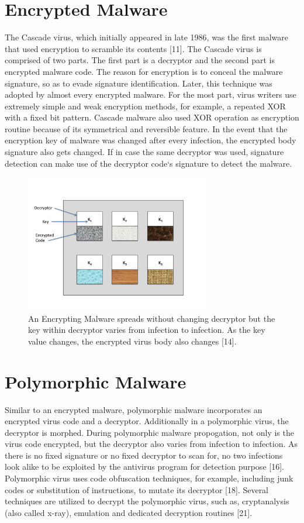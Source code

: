 \section{Encrypted Malware} 

The Cascade virus, which initially appeared in late 1986, was the first malware that used encryption to scramble its contents [11]. The Cascade virus is comprised of two parts. The first part is a decryptor and the second part is encrypted malware code. The reason for encryption is to conceal the malware signature, so as to evade signature identification. Later, this technique was adopted by almost every encrypted malware.  For the most part, virus writers use extremely simple and weak encryption methods, for example, a repeated XOR with a fixed bit pattern. Cascade malware also used XOR operation as encryption routine because of its symmetrical and reversible feature. In the event that the encryption key of malware was changed after every infection, the encrypted body signature also gets changed. If in case the same decryptor was used, signature detection can make use of the decryptor code`s signature to detect the malware.
\begin{figure}
    \centering    
    \includegraphics[width=8cm, height=6cm]{encryptedvirus.jpg}
    \caption[Encrypted Malware Replication]{An Encrypting Malware spreads without changing decryptor but the key within decryptor varies from infection to infection. As the key value changes, the encrypted virus body also changes [14].}
\end{figure}
\section{Polymorphic Malware} 

Similar to an encrypted malware, polymorphic malware incorporates an encrypted virus code and a decryptor. Additionally in a polymorphic virus, the decryptor is morphed. During polymorphic malware propogation, not only is the virus code encrypted, but the decryptor also varies from infection to infection. As there is no fixed signature or no fixed decryptor to scan for, no two infections look alike to be exploited by the antivirus program for detection purpose [16]. Polymorphic virus uses code obfuscation techniques, for example, including junk codes or substitution of instructions, to mutate its decryptor [18].
Several techniques are utilized to decrypt the polymorphic virus, such as, cryptanalysis (also called x-ray), emulation and dedicated decryption routines [21].

